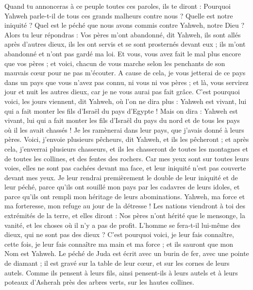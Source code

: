 \begin{multicols}{2}
Quand tu annonceras à ce peuple toutes ces paroles, ils te diront : Pourquoi Yahweh parle-t-il de tous ces grands malheurs contre nous ? Quelle est notre iniquité ? Quel est le péché que nous avons commis contre Yahweh, notre Dieu ?
Alors tu leur répondras : Vos pères m'ont abandonné, dit Yahweh, ils sont allés après d'autres dieux, ils les ont servis et se sont prosternés devant eux ; ils m'ont abandonné et n'ont pas gardé ma loi.
Et vous, vous avez fait le mal plus encore que vos pères ; et voici, chacun de vous marche selon les penchants de son mauvais cœur pour ne pas m'écouter.
A cause de cela, je vous jetterai de ce pays dans un pays que vous n'avez pas connu, ni vous ni vos pères ; et là, vous servirez jour et nuit les autres dieux, car je ne vous aurai pas fait grâce.
C'est pourquoi voici, les jours viennent, dit Yahweh, où l'on ne dira plus : Yahweh est vivant, lui qui a fait monter les fils d'Israël du pays d'Egypte !
Mais on dira : Yahweh est vivant, lui qui a fait monter les fils d'Israël du pays du nord et de tous les pays où il les avait chassés ! Je les ramènerai dans leur pays, que j'avais donné à leurs pères.
Voici, j'envoie plusieurs pêcheurs, dit Yahweh, et ils les pêcheront ; et après cela, j'enverrai plusieurs chasseurs, et ils les chasseront de toutes les montagnes et de toutes les collines, et des fentes des rochers.
Car mes yeux sont sur toutes leurs voies, elles ne sont pas cachées devant ma face, et leur iniquité n'est pas couverte devant mes yeux.
Je leur rendrai premièrement le double de leur iniquité et de leur péché, parce qu'ils ont souillé mon pays par les cadavres de leurs idoles, et parce qu'ils ont rempli mon héritage de leurs abominations.
Yahweh, ma force et ma forteresse, mon refuge au jour de la détresse ! Les nations viendront à toi des extrémités de la terre, et elles diront : Nos pères n'ont hérité que le mensonge, la vanité, et les choses où il n'y a pas de profit.
L'homme se fera-t-il lui-même des dieux, qui ne sont pas des dieux ?
C'est pourquoi voici, je leur fais connaître, cette fois, je leur fais connaître ma main et ma force ; et ils sauront que mon Nom est Yahweh.
\VerseOne{}Le péché de Juda est écrit avec un burin de fer, avec une pointe de diamant ; il est gravé sur la table de leur cœur, et sur les cornes de leurs autels.
Comme ils pensent à leurs fils, ainsi pensent-ils à leurs autels et à leurs poteaux d'Asherah près des arbres verts, sur les hautes collines.

\end{multicols}
